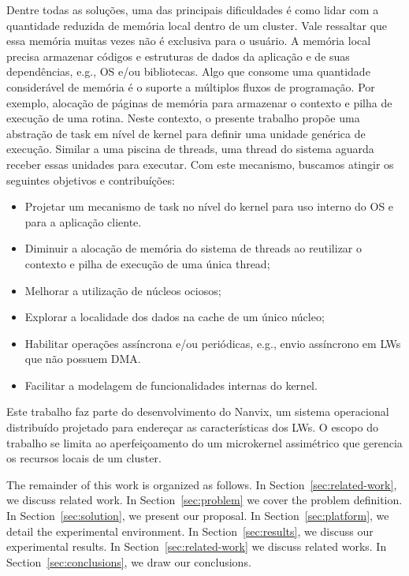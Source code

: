 	Dentre todas as soluções, uma das principais dificuldades é como lidar
	com a quantidade reduzida de memória local dentro de um cluster. Vale
	ressaltar que essa memória muitas vezes não é exclusiva para o usuário.
	A memória local precisa armazenar códigos e estruturas de  dados da
	aplicação e de suas dependências, e.g., OS e/ou bibliotecas.
	Algo que consome uma quantidade considerável de memória é o suporte
	a múltiplos fluxos de programação. Por exemplo, alocação de páginas de
	memória para armazenar o contexto e pilha de execução de uma rotina.
	Neste contexto, o presente trabalho propõe uma abstração de task em nível
	de kernel para definir uma unidade genérica de execução. Similar a uma
	piscina de threads, uma thread do sistema aguarda receber essas unidades
	para executar.
	Com este mecanismo, buscamos atingir os seguintes objetivos
	e contribuíções:
	\begin{itemize}
		\item Projetar um mecanismo de task no nível do kernel para uso interno
			do OS e para a aplicação cliente.

		\item Diminuir a alocação de memória do sistema de threads ao
			reutilizar o contexto e pilha de execução de uma única thread;

		\item Melhorar a utilização de núcleos ociosos;

		\item Explorar a localidade dos dados na cache de um único núcleo;

		\item Habilitar operações assíncrona e/ou periódicas, e.g.,
			envio assíncrono em LWs que não possuem DMA.

		\item Facilitar a modelagem de funcionalidades internas do kernel.
	\end{itemize}
	Este trabalho faz parte do desenvolvimento do Nanvix, um sistema operacional
	distribuído projetado para endereçar as características dos LWs. O escopo
	do trabalho se limita ao aperfeiçoamento do um microkernel assimétrico que
	gerencia os recursos locais de um cluster.

	The remainder of this work is organized as follows.
	In Section~\ref{sec:related-work}, we discuss related work.
	In Section~\ref{sec:problem} we cover the problem definition.
	In Section~\ref{sec:solution}, we present our proposal.
	In Section~\ref{sec:platform}, we detail the experimental environment.
	In Section~\ref{sec:results}, we discuss our experimental results.
	In Section~\ref{sec:related-work} we discuss related works.
	In Section~\ref{sec:conclusions}, we draw our conclusions.
